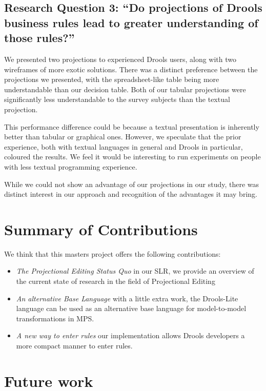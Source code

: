 \subsection{Research Question 3: ``Do projections of Drools business rules lead to greater understanding of those rules?''}

We presented two projections to experienced Drools users, along with two wireframes of more exotic solutions.
There was a distinct preference between the projections we presented, with the spreadsheet-like table being more understandable than our decision table.
Both of our tabular projections were significantly less understandable to the survey subjects than the textual projection.

This performance difference could be because a textual presentation is inherently better than tabular or graphical ones.
However, we speculate that the prior experience, both with textual languages in general and Drools in particular, coloured the results.
We feel it would be interesting to run experiments on people with less textual programming experience.

While we could not show an advantage of our projections in our study, there was distinct interest in our approach and recognition of the advantages it may bring.

\section{Summary of Contributions}

We think that this masters project offers the following contributions:
\begin{itemize}
    \item \emph{The Projectional Editing Status Quo} in our SLR, we provide an overview of the current state of research in the field of Projectional Editing
    \item \emph{An alternative Base Language} with a little extra work, the Drools-Lite language can be used as an alternative base language for model-to-model transformations in MPS.
    \item \emph{A new way to enter rules} our implementation allows Drools developers a more compact manner to enter rules.
\end{itemize}

\section{Future work}

